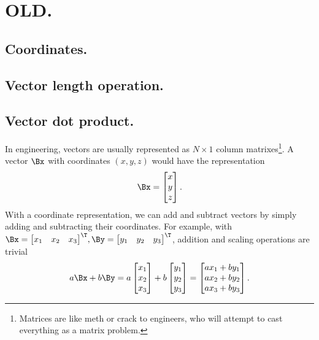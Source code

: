 
\section{OLD.}
\subsection{Coordinates.}
\subsection{Vector length operation.}
\subsection{Vector dot product.}
In engineering, vectors are usually represented as \( N \times 1 \) column matrixes\footnote{Matrices are like meth or crack to engineers, who will attempt to cast everything as a matrix problem.}.
A vector \( \Bx \) with coordinates \((x,y,z)\) would have the representation
\begin{dmath}\label{eqn:multivector:60}
\Bx =
\begin{bmatrix}
x \\
y \\
z
\end{bmatrix}.
\end{dmath}
With a coordinate representation, we can add and subtract vectors by simply adding and subtracting their coordinates.
For example, with
\(
\Bx =
{
\begin{bmatrix}
x_1 &
x_2 &
x_3
\end{bmatrix}
}^\T,
\By =
{\begin{bmatrix}
y_1 &
y_2 &
y_3
\end{bmatrix}}^\T \), addition and scaling operations are trivial
\begin{equation}\label{eqn:multivector:140}
a \Bx + b \By
=
a
\begin{bmatrix}
x_1 \\
x_2 \\
x_3
\end{bmatrix}
+
b
\begin{bmatrix}
y_1 \\
y_2 \\
y_3
\end{bmatrix}
=
\begin{bmatrix}
a x_1 + b y_1 \\
a x_2 + b y_2 \\
a x_3 + b y_3
\end{bmatrix}.
\end{equation}

